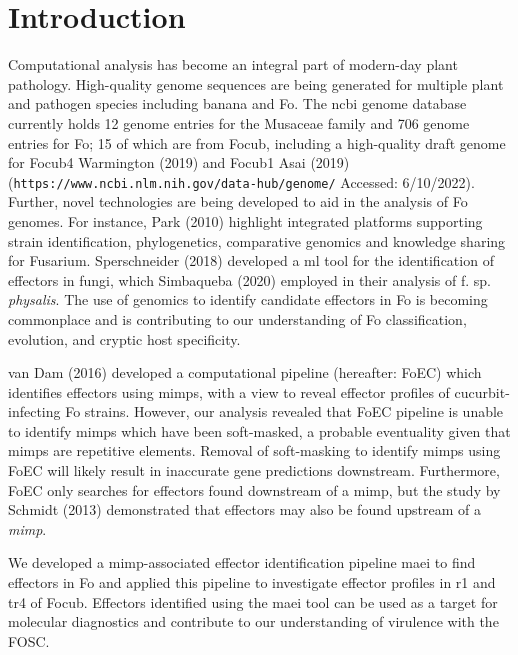 \section{Introduction}

Computational analysis has become an integral part of modern-day plant pathology. High-quality genome sequences are being generated for multiple plant and pathogen species including banana and \ac{Fo}. The \ac{ncbi} genome database currently holds 12 genome entries for the Musaceae family and 706 genome entries for \ac{Fo}; 15 of which are from \ac{Focub}, including a high-quality draft genome for \ac{Focub4} Warmington \et (2019) and \ac{Focub1} Asai \et (2019) (\texttt{https://www.ncbi.nlm.nih.gov/data-hub/genome/} Accessed: 6/10/2022).  Further, novel technologies are being developed to aid in the analysis of \ac{Fo} genomes. For instance, Park \et (2010) highlight integrated platforms supporting strain identification, phylogenetics, comparative genomics and knowledge sharing for Fusarium. Sperschneider \et (2018) developed a \ac{ml} tool for the identification of effectors in fungi, which Simbaqueba \et (2020) employed in their analysis of \Fo f. sp. \textit{physalis}. The use of genomics to identify candidate effectors in \ac{Fo} is becoming commonplace and is contributing to our understanding of \ac{Fo} classification, evolution, and cryptic host specificity.

van Dam \et  (2016) developed a computational pipeline (hereafter: FoEC) which identifies effectors using \ac{mimp}s, with a view to reveal effector profiles of cucurbit-infecting \ac{Fo} strains. However, our analysis revealed that FoEC pipeline is unable to identify \ac{mimp}s which have been soft-masked, a probable eventuality given that \ac{mimp}s are repetitive elements. Removal of soft-masking to identify \ac{mimp}s using FoEC will likely result in inaccurate gene predictions downstream. Furthermore, FoEC only searches for effectors found downstream of a \ac{mimp}, but the study by Schmidt \et (2013) demonstrated that effectors may also be found upstream of a \textit{mimp}. 

We developed a \ac{mimp}-associated effector identification pipeline \ac{maei} to find effectors in \ac{Fo} and applied this pipeline to investigate effector profiles in \ac{r1} and \ac{tr4} of \ac{Focub}. Effectors identified using the \ac{maei} tool can be used as a target for molecular diagnostics and contribute to our understanding of virulence with the \ac{FOSC}. 



